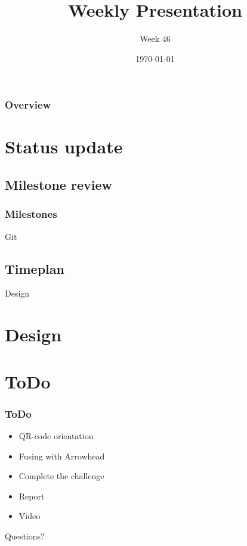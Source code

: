 \documentclass{beamer}
\title{Weekly Presentation}
\subtitle{Week 46}
\author{}
\institute{Luleå University of Technology}
\date{\today}
\begin{document}
\begin{frame}
    \titlepage
\end{frame}

\begin{frame}
    \frametitle{Overview}
    \tableofcontents
\end{frame}

\section{Status update}
\subsection{Milestone review}
\begin{frame}
    \frametitle{Milestones}
    \centering
    \Huge Git
\end{frame}
\subsection{Timeplan}


\begin{frame}
    \centering
    \Huge Design
\end{frame}

\section{Design}


\section{ToDo}
\begin{frame}
    \frametitle{ToDo}
    \begin{itemize}
        \item QR-code orientation
        \item Fusing with Arrowhead
        \item Complete the challenge
        \item Report
        \item Video
    \end{itemize}
\end{frame}






\begin{frame}
    \begin{center}
        \Huge Questions?
    \end{center}
\end{frame}
\end{document}
